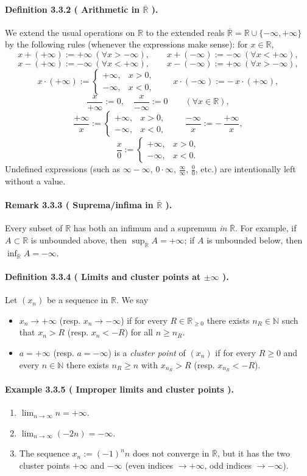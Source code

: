 \documentclass[12pt,a4paper]{article}
\newcommand{\N}{\mathbb{N}}
\newcommand{\R}{\mathbb{R}}
\newcommand{\NumberedDefinition}[3]{%
\paragraph*{Definition #1 ( #2 ).} #3\par}
\newcommand{\NumberedExample}[3]{%
\paragraph*{Example #1 ( #2 ).} #3\par}
\newcommand{\NumberedRemark}[3]{%
\paragraph*{Remark #1 ( #2 ).} #3\par}
\theoremstyle{plain}
\theoremstyle{definition}
\theoremstyle{remark}
\begin{document}
\NumberedDefinition{3.3.2}{Arithmetic in $\overline{\R}$}{We extend the usual operations on $\R$ to the extended reals $\overline{\R}=\R\cup\{-\infty,+\infty\}$ by the following rules (whenever the expressions make sense): for $x\in\R$,
\[
	x + (+\infty) := +\infty \ (\forall x> -\infty),\qquad x + (-\infty) := -\infty \ (\forall x< +\infty),
\]
\[
	x - (+\infty) := -\infty \ (\forall x< +\infty),\qquad x - (-\infty) := +\infty \ (\forall x> -\infty),
\]
\[
	x\cdot (+\infty) := \begin{cases}
		+\infty,& x>0,\\[-2pt]
		-\infty,& x<0,
	\end{cases}
	\qquad
	x\cdot (-\infty) := -\,x\cdot(+\infty),
\]
\[
	\frac{x}{+\infty} := 0,\quad \frac{x}{-\infty} := 0 \qquad (\forall x\in\R),
\]
\[
	\frac{+\infty}{x} := \begin{cases}
		+\infty,& x>0,\\[-2pt]
		-\infty,& x<0,
	\end{cases}
	\qquad
	\frac{-\infty}{x} := -\,\frac{+\infty}{x},
\]
\[
	\frac{x}{0} := \begin{cases}
		+\infty,& x>0,\\[-2pt]
		-\infty,& x<0.
	\end{cases}
\]
Undefined expressions (such as $\infty-\infty$, $0\cdot\infty$, $\tfrac{\infty}{\infty}$, $\tfrac{0}{0}$, etc.) are intentionally left without a value.}

\NumberedRemark{3.3.3}{Suprema/infima in $\overline{\R}$}{Every subset of $\R$ has both an infimum and a supremum \emph{in} $\overline{\R}$. For example, if $A\subset\R$ is unbounded above, then $\sup_{\overline{\R}} A=+\infty$; if $A$ is unbounded below, then $\inf_{\overline{\R}} A=-\infty$.}

\NumberedDefinition{3.3.4}{Limits and cluster points at $\pm\infty$}{Let $(x_n)$ be a sequence in $\R$. We say
\begin{itemize}[leftmargin=*]
	\item $x_n\to +\infty$ (resp. $x_n\to -\infty$) if for every $R\in\R_{\ge0}$ there exists $n_R\in\N$ such that $x_n>R$ (resp. $x_n<-R$) for all $n\ge n_R$.
	\item $a=+\infty$ (resp. $a=-\infty$) is a \emph{cluster point} of $(x_n)$ if for every $R\ge 0$ and every $n\in\N$ there exists $n_R\ge n$ with $x_{n_R}>R$ (resp. $x_{n_R}< -R$).
\end{itemize}}

\NumberedExample{3.3.5}{Improper limits and cluster points}{
\begin{enumerate}[label={(\arabic*)}, leftmargin=*]
	\item $\displaystyle \lim_{n\to\infty} n = +\infty$.
	\item $\displaystyle \lim_{n\to\infty} (-2n) = -\infty$.
	\item The sequence $x_n:=(-1)^n n$ does not converge in $\overline{\R}$, but it has the two cluster points $+\infty$ and $-\infty$ (even indices $\to +\infty$, odd indices $\to -\infty$).
\end{enumerate}}
\end{document}
